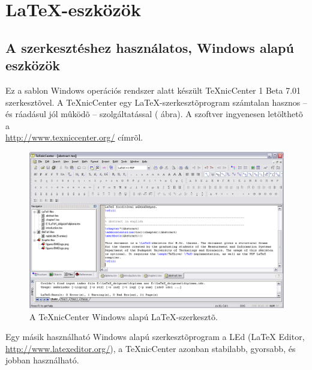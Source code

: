 \chapter{\LaTeX-eszközök}\label{sect:LatexTools}
\section{A szerkesztéshez használatos, Windows alapú eszközök}
Ez a sablon Windows operációs rendszer alatt készült TeXnicCenter 1 Beta 7.01 szerkesztõvel. A TeXnicCenter egy \LaTeX-szerkesztõprogram számtalan hasznos -- és ráadásul jól mûködõ -- szolgáltatással ( ábra). A szoftver ingyenesen letölthetõ a\\\url{http://www.texniccenter.org/} címrõl.

\begin{figure}[!ht]
\centering
\includegraphics[width=150mm, keepaspectratio]{figures/TeXnicCenter.png}
\caption{A TeXnicCenter Windows alapú \LaTeX-szerkesztõ.} 
\label{fig:TexnicCenter}
\end{figure}

Egy másik használható Windows alapú szerkesztõprogram a LEd (LaTeX Editor,\\\url{http://www.latexeditor.org/}), a TeXnicCenter azonban stabilabb, gyorsabb, és jobban használható.

